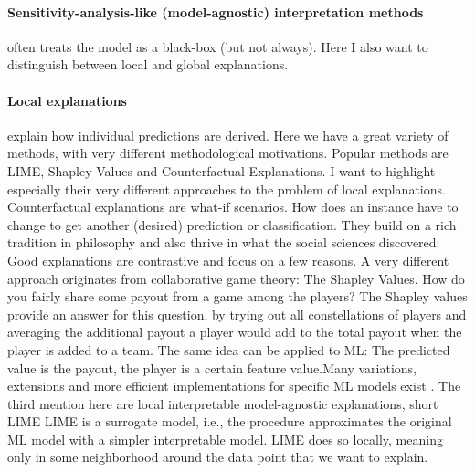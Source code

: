 \documentclass[runningheads]{llncs}
\begin{document}
\paragraph{Sensitivity-analysis-like (model-agnostic) interpretation methods} often treats the model as a black-box (but not always).
Here I also want to distinguish between local and global explanations.

\paragraph{Local explanations} explain how individual predictions are derived.
Here we have a great variety of methods, with very different methodological motivations.
Popular methods are LIME, Shapley Values and Counterfactual Explanations.
I want to highlight especially their very different approaches to the problem of local explanations.
Counterfactual explanations are what-if scenarios.
How does an instance have to change to get another (desired) prediction or classification.
They build on a rich tradition in philosophy and also thrive in what the social sciences discovered:
Good explanations are contrastive and focus on a few reasons.
A very different approach originates from collaborative game theory: The Shapley Values.
How do you fairly share some payout from a game among the players?
The Shapley values \cite{shapley1953value} provide an answer for this question, by trying out all constellations of players and averaging the additional payout a player would add to the total payout when the player is added to a team.
The same idea can be applied to ML: The predicted value is the payout, the player is a certain feature value.Many variations, extensions and more efficient implementations for specific ML models exist \cite{vstrumbelj2014explaining,lundberg2017unified,lundberg2018consistent}.
The third mention here are local interpretable model-agnostic explanations, short LIME \cite{ribeiro2016should}
LIME is a surrogate model, i.e., the procedure approximates the original ML model with a simpler interpretable model.
LIME does so locally, meaning only in some neighborhood around the data point that we want to explain.
\end{document}
